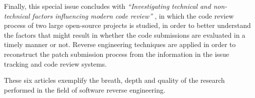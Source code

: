 \documentclass{svjour3}                     %
\begin{document}
Finally, this special issue concludes with \emph{``Investigating technical and non-technical factors influencing modern code review''} \citep{codeReview}, in which the code review process of two large open-source projects is studied, in order to better understand the factors that might result in whether the code submissions are evaluated in a timely manner or not. Reverse engineering techniques are applied in order to reconstruct the patch submission process from the information in the issue tracking and code review systems.

These six articles exemplify the breath, depth and quality of the research performed in the field of software reverse engineering.











\end{document}
